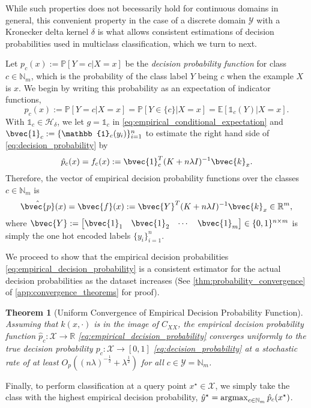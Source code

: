 \documentclass{article}
\newcommand{\argmax}{\operatornamewithlimits{argmax}}
\newtheorem{theorem}{Theorem}[section]
\begin{document}
	While such properties does not becessarily hold for continuous domains in general, this convenient property in the case of a discrete domain $\mathcal{Y}$ with a Kronecker delta kernel $\delta$ is what allows consistent estimations of decision probabilities used in multiclass classification, which we turn to next.
	
	Let $p_{c}(x) := \mathbb{P}[Y = c | X = x]$ be the \textit{decision probability function} for class $c \in \mathbb{N}_{m}$, which is the probability of the class label $Y$ being $c$ when the example $X$ is $x$. We begin by writing this probability as an expectation of indicator functions,
	\begin{equation}
		p_{c}(x) := \mathbb{P}[Y = c | X = x] = \mathbb{P}[Y \in \{c\} | X = x] = \mathbb{E}[\mathbb{1}_{c}(Y) | X = x].
	\label{eq:decision_probability}
	\end{equation}	
	With $\mathbb{1}_{c} \in \mathcal{H}_{\delta}$, we let $g = \mathbb{1}_{c}$ in \eqref{eq:empirical_conditional_expectation} and $\bvec{1}_{c} := \{\mathbb{1}_{c}(y_{i})\}_{i = 1}^{n}$ to estimate the right hand side of \eqref{eq:decision_probability} by
	\begin{equation}
		\hat{p}_{c}(x) = f_{c}(x) := \bvec{1}_{c}^{T} (K + n \lambda I)^{-1} \bvec{k}_{x}.
	\label{eq:empirical_decision_probability}
	\end{equation}
	Therefore, the vector of empirical decision probability functions over the classes $c \in \mathbb{N}_{m}$ is
	\begin{equation}
		\hat{\bvec{p}}(x) = \bvec{f}(x) := \bvec{Y}^{T} (K + n \lambda I)^{-1} \bvec{k}_{x} \in \mathbb{R}^{m},
	\label{eq:empirical_decision_probability_vector}
	\end{equation}
	where $\bvec{Y} := \begin{bmatrix} \bvec{1}_{1} & \bvec{1}_{2} & \cdots & \bvec{1}_{m} \end{bmatrix} \in \{0, 1\}^{n \times m}$ is simply the one hot encoded labels $\{y_{i}\}_{i = 1}^{n}$.

	We proceed to show that the empirical decision probabilities \eqref{eq:empirical_decision_probability} is a consistent estimator for the actual decision probabilities as the dataset increases (See \cref{thm:probability_convergence} of \cref{app:convergence_theorems} for proof).
	\begin{theorem}[Uniform Convergence of Empirical Decision Probability Function]
		\label{thm:probability_convergence_copy}
		Assuming that $k(x, \cdot)$ is in the image of $C_{XX}$, the empirical decision probability function $\hat{p}_{c} : \mathcal{X} \to \mathbb{R}$ \eqref{eq:empirical_decision_probability} converges uniformly to the true decision probability $p_{c} : \mathcal{X} \to [0, 1]$ \eqref{eq:decision_probability} at a stochastic rate of at least $O_{p}((n \lambda)^{-\frac{1}{2}} + \lambda^{\frac{1}{2}})$ for all $c \in \mathcal{Y} = \mathbb{N}_{m}$.
	\end{theorem}
	Finally, to perform classification at a query point $x^{\star} \in \mathcal{X}$, we simply take the class with the highest empirical decision probability, $\hat{y}^{\star} = \argmax_{c \in \mathbb{N}_{m}} \hat{p}_{c}(x^{\star})$.
\end{document}
